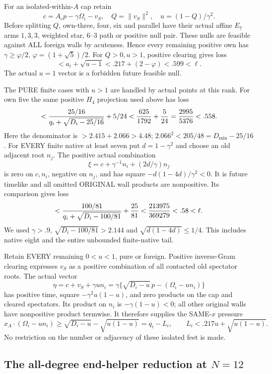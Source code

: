 \documentclass[11pt]{article}
\begin{document}
For an isolated-within-\(A\) cap retain
\[
 c=A_cp-\gamma\Omega_i-v_S,\quad
 Q=\|v_S\|^2,\quad u=(1-Q)/\gamma^2 .
\]
Before splitting \(Q\), own-three, four, six
and parallel have their actual affine
\(E_7\) arms \(1,3,3\), weighted star,
\(6\)--\(3\) path or positive null pair.
These nulls are feasible against ALL foreign
walls by acuteness.
Hence every remaining positive own has
\(\gamma\ge\varphi/2\), \(\varphi=(1+\sqrt5)/2\).
For \(Q>0,u>1\), positive clearing gives loss
\[
 <a_i+\sqrt{u-1}<.217+(2-\varphi)<.599<\ell.
\]
The actual \(u=1\) vector is a forbidden
future feasible null.

The PURE finite cases with \(u>1\) are
handled by actual points at this rank.
For own five the same positive \(H_4\)
projection used above has loss
\[
 <{25/16\over q_i+\sqrt{D_i-25/16}}+5/24
 <{625\over1792}+{5\over24}
 ={2995\over5376}<.558.
\]
Here the denominator is \(>2.415+2.066>4.48\);
\(2.066^2<205/48=D_{\min}-25/16\).
For EVERY finite native at least seven put
\(d=1-\gamma^2\) and choose an old adjacent
root \(n_j\).  The positive actual combination
\[
 \xi=c+\gamma^{-1}n_i+(2d/\gamma)n_j
\]
is zero on \(c,n_i\), negative on \(n_j\),
and has square \(-d(1-4d)/\gamma^2<0\).
It is future timelike and all omitted
ORIGINAL wall products are nonpositive.
Its comparison gives loss
\[
 <{100/81\over q_i+\sqrt{D_i-100/81}}
                   +{25\over81}
 <{213975\over369279}<.58<\ell.
\]
We used \(\gamma>.9\),
\(\sqrt{D_i-100/81}>2.144\) and
\(\sqrt{d(1-4d)}\le1/4\).
This includes native eight and the entire
unbounded finite-native tail.

Retain EVERY remaining \(0<u<1\), pure or
foreign.  Positive inverse-Gram clearing
expresses \(v_S\) as a positive combination
of all contacted old spectator roots.
The actual vector
\[
 \eta=c+v_S+\gamma un_i
   =\gamma\{\sqrt{D_i-u}\,p-(\Omega_i-un_i)\}
\]
has positive time, square
\(-\gamma^2u(1-u)\), and zero products on
the cap and cleared spectators.
Its product on \(n_i\) is
\(-\gamma(1-u)<0\); all other original
walls have nonpositive product termwise.
It therefore supplies the SAME-\(x\) pressure
\[
 x_A\cdot(\Omega_i-un_i)
       \ge\sqrt{D_i-u}-\sqrt{u(1-u)}
       =q_i-L_i,\qquad
 L_i<.217u+\sqrt{u(1-u)} .
\tag{A11foot}\label{eq:arithA11foot}
\]
No restriction on the number or adjacency
of these isolated feet is made.

\subsection{The all-degree end-helper reduction at \(N=12\)}
\label{app:arithA11helperfield}
\end{document}

